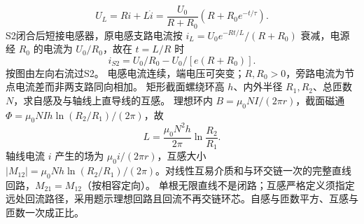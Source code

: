 \[
U_L=Ri+L\dot i=\frac{U_0}{R+R_0}(R+R_0e^{-t/\tau}).
\]
S2闭合后短接电感器，原电感支路电流按 $i_L=U_0 e^{-Rt/L}/(R+R_0)$ 衰减，电源经 $R_0$ 的电流为 $U_0/R_0$，故在 $t=L/R$ 时
\[
i_{S2}=U_0/R_0-U_0/[e(R+R_0)].
\]
按图由左向右流过S2。
\crosscheck 电感电流连续，端电压可突变；$R,R_0>0$，旁路电流为节点电流差而非两支路同向相加。
\problemtext 矩形截面螺绕环高 $h$、内外半径 $R_1,R_2$、总匝数 $N$，求自感及与轴线上直导线的互感。
\workings 理想环内 $B=\mu_0NI/(2\pi r)$，截面磁通 $\Phi=\mu_0NIh\ln(R_2/R_1)/(2\pi)$，故
\[
L=\frac{\mu_0N^2h}{2\pi}\ln\frac{R_2}{R_1}.
\]
轴线电流 $i$ 产生的场为 $\mu_0i/(2\pi r)$，互感大小 $|M_{12}|=\mu_0Nh\ln(R_2/R_1)/(2\pi)$。对线性互易介质和与环交链一次的完整直线回路，$M_{21}=M_{12}$（按相容定向）。
\crosscheck 单根无限直线不是闭路；互感严格定义须指定远处回流路径，采用题示理想回路且回流不再交链环芯。自感与匝数平方、互感与匝数一次成正比。

